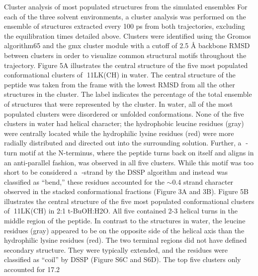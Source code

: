 Cluster analysis of most populated structures from the simulated ensembles
For each of the three solvent environments, a cluster analysis was performed on the ensemble of structures extracted every 100 ps from both trajectories, excluding the equilibration times detailed above. Clusters were identified using the Gromos algorithm65 and the gmx cluster module with a cutoff of 2.5 Å backbone RMSD between clusters in order to visualize common structural motifs throughout the trajectory. Figure 5A illustrates the central structure of the five most populated conformational clusters of 11LK(CH) in water. The central structure of the peptide was taken from the frame with the lowest RMSD from all the other structures in the cluster. The label indicates the percentage of the total ensemble of structures that were represented by the cluster. In water, all of the most populated clusters were disordered or unfolded conformations. None of the five clusters in water had helical character; the hydrophobic leucine residues (gray) were centrally located while the hydrophilic lysine residues (red) were more radially distributed and directed out into the surrounding solution. Further, a -turn motif at the N-terminus, where the peptide turns back on itself and aligns in an anti-parallel fashion, was observed in all five clusters. While this motif was too short to be considered a -strand by the DSSP algorithm and instead was classified as “bend,” these residues accounted for the $\sim$0.4 strand character observed in the stacked conformational fractions (Figure 3A and 3B).
Figure 5B illustrates the central structure of the five most populated conformational clusters of 11LK(CH) in 2:1 t-BuOH:H2O. All five contained 2-3 helical turns in the middle region of the peptide. In contrast to the structures in water, the leucine residues (gray) appeared to be on the opposite side of the helical axis than the hydrophilic lysine residues (red). The two terminal regions did not have defined secondary structure. They were typically extended, and the residues were classified as “coil” by DSSP (Figure S6C and S6D). The top five clusters only accounted for 17.2%
